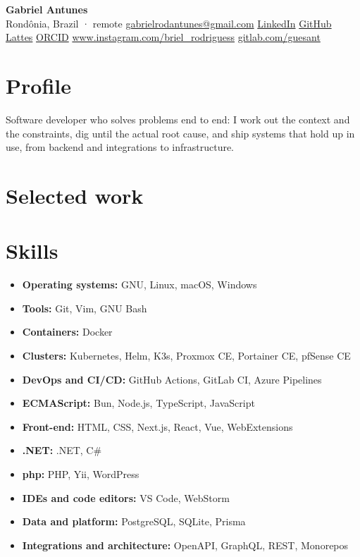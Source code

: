 \documentclass[a4paper,10pt]{article}
\begin{document}
\begin{center}
    {\LARGE \textbf{Gabriel Antunes}}
    \\ [0.1cm]
    Rondônia, Brazil · remote
    {\textbullet}
    \href{mailto:gabrielrodantunes@gmail.com}{gabrielrodantunes@gmail.com}
    {\textbullet}
    \href{https://linkedin.com/in/gabrielrodantunes}{LinkedIn}
    {\textbullet}
    \href{https://github.com/guesant}{GitHub}
    {\textbullet}
    \href{http://lattes.cnpq.br/5981427817317311}{Lattes}
    {\textbullet}
    \href{https://orcid.org/0009-0009-0221-943X}{ORCID}
    {\textbullet}
    \href{https://www.instagram.com/briel_rodriguess}{www.instagram.com/briel\_rodriguess}
    {\textbullet}
    \href{https://gitlab.com/guesant}{gitlab.com/guesant}
\end{center}

\section{Profile}
    Software developer who solves problems end to end: I work out the context and the constraints, dig until the actual root cause, and ship systems that hold up in use, from backend and integrations to infrastructure.



\section{Selected work}
    

\section{Skills}
    \begin{itemize}
                \item \textbf{Operating systems:} GNU, Linux, macOS, Windows
        \item \textbf{Tools:} Git, Vim, GNU Bash
        \item \textbf{Containers:} Docker
        \item \textbf{Clusters:} Kubernetes, Helm, K3s, Proxmox CE, Portainer CE, pfSense CE
        \item \textbf{DevOps and CI/CD:} GitHub Actions, GitLab CI, Azure Pipelines
        \item \textbf{ECMAScript:} Bun, Node.js, TypeScript, JavaScript
        \item \textbf{Front-end:} HTML, CSS, Next.js, React, Vue, WebExtensions
        \item \textbf{.NET:} .NET, C\#
        \item \textbf{php:} PHP, Yii, WordPress
        \item \textbf{IDEs and code editors:} VS Code, WebStorm
        \item \textbf{Data and platform:} PostgreSQL, SQLite, Prisma
        \item \textbf{Integrations and architecture:} OpenAPI, GraphQL, REST, Monorepos
    \end{itemize}
\end{document}
